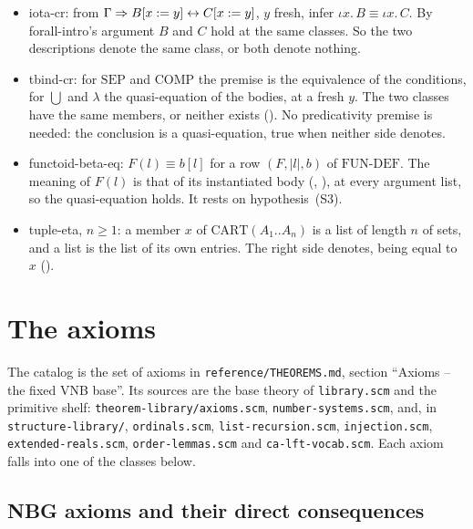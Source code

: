 \begin{itemize}
\item iota-cr: from $\Gamma\Rightarrow B[x:=y]\leftrightarrow C[x:=y]$, $y$ fresh,
  infer $\iota x.\,B\equiv\iota x.\,C$.  By forall-intro's argument $B$ and
  $C$ hold at the same classes.  So the two descriptions denote the same
  class, or both denote nothing.
\item tbind-cr: for $\mathrm{SEP}$ and $\mathrm{COMP}$ the premise is
  the equivalence of the conditions, for $\bigcup$ and $\lambda$ the
  quasi-equation of the bodies, at a fresh $y$.  The two classes have the
  same members, or neither exists ().  No predicativity premise is
  needed: the conclusion is a quasi-equation, true when neither side
  denotes.
\item functoid-beta-eq: $F(l)\equiv b[l]$ for a row $(F,|l|,b)$ of
  $\mathrm{FUN\text{-}DEF}$.  The meaning of $F(l)$ is that of its
  instantiated body (, ), at every argument list, so the
  quasi-equation holds.  It rests on hypothesis~(S3).
\item tuple-eta, $n\geq1$: a member $x$ of $\mathrm{CART}(A_1..A_n)$ is a
  list of length $n$ of sets, and a list is the list of its own entries.
  The right side denotes, being equal to $x$ ().
\end{itemize}

\section{The axioms}\label{sec:meta-axioms}

The catalog is the set of axioms in \texttt{reference/THEOREMS.md},
section ``Axioms -- the fixed VNB base''.  Its sources are the base
theory of \texttt{library.scm} and the primitive shelf:
\texttt{theorem-library/axioms.scm}, \texttt{number-systems.scm},
and, in \texttt{structure-library/}, \texttt{ordinals.scm},
\texttt{list-recursion.scm}, \texttt{injection.scm},
\texttt{extended-reals.scm}, \texttt{order-lemmas.scm} and
\texttt{ca-lft-vocab.scm}.  Each
axiom falls into one of the classes below.

\subsection{NBG axioms and their direct consequences}

